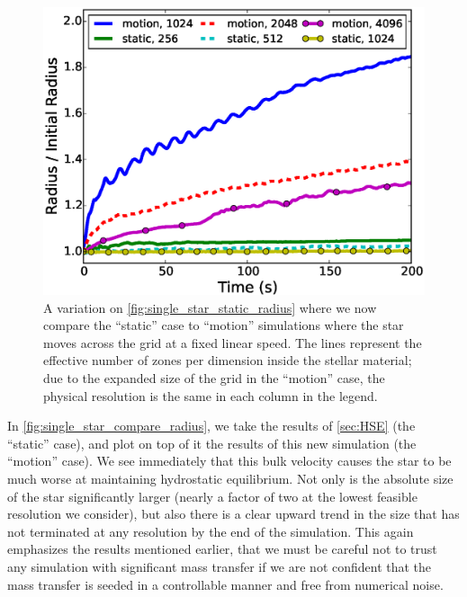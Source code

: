 \documentclass[12pt]{article}
\begin{document}
\begin{figure}[h!]
  \centering
  \includegraphics[scale=0.8,trim=0.1in 0.0in 0.6in 0.6in,clip]{plots/single_star_compare_1e3_radius}
  \caption[Moving star versus static star]
          {A variation on \autoref{fig:single_star_static_radius} where
           we now compare the ``static'' case to ``motion'' simulations where the 
           star moves across the grid at a fixed linear speed. The lines represent 
           the effective number of zones per dimension inside the stellar material;
           due to the expanded size of the grid in the ``motion'' case, the 
           physical resolution is the same in each column in the legend.
           \label{fig:single_star_compare_radius}}
\end{figure}

In \autoref{fig:single_star_compare_radius}, we take the results of
\autoref{sec:HSE} (the ``static'' case), and plot on top of it the
results of this new simulation (the ``motion'' case). We see
immediately that this bulk velocity causes the star to be much worse
at maintaining hydrostatic equilibrium. Not only is the absolute size
of the star significantly larger (nearly a factor of two at the lowest
feasible resolution we consider), but also there is a clear upward
trend in the size that has not terminated at any resolution by the end
of the simulation.  This again emphasizes the results mentioned
earlier, that we must be careful not to trust any simulation with
significant mass transfer if we are not confident that the mass
transfer is seeded in a controllable manner and free from numerical
noise.
\end{document}
